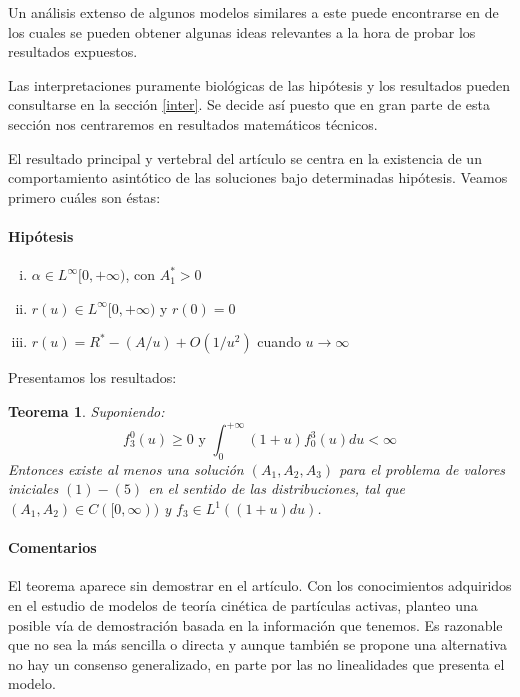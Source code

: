 \documentclass[1p]{elsarticle}
\newtheorem{thm}{Teorema}
\begin{document}
 Un análisis extenso de algunos modelos similares a este puede encontrarse en \cite{elvesier,existencia,libro,original,pdf,textolargo} de los cuales se pueden obtener algunas ideas relevantes a la hora de probar los resultados expuestos.

Las interpretaciones puramente biológicas de las hipótesis y los resultados pueden consultarse en la sección \ref*{inter}. Se decide así puesto que en gran parte de esta sección nos centraremos en resultados matemáticos técnicos.

El resultado principal y vertebral del artículo se centra en la existencia de un comportamiento asintótico de las soluciones bajo determinadas hipótesis.
Veamos primero cuáles son éstas:
\paragraph{Hipótesis}
\label{hipo}\begin{enumerate}[(i)]
	\item $\alpha \in L^\infty[0,+\infty)$, con $A_1^*>0$
	\item $r(u)\in L^\infty[0,+\infty)$ y $r(0)=0$
	\item $r(u)=R^*-(A/u)+O(1/u^2)$ cuando $u\rightarrow\infty$
\end{enumerate}
Presentamos los resultados:

 \begin{thm}
Suponiendo: \begin{equation}f_3^0(u)\geq0 \text{ y } \int_{0}^{+\infty}(1+u)f_0^3(u)du<\infty\label{cond}\end{equation}
Entonces existe al menos una solución $(A_1,A_2,A_3)$ para el problema de valores iniciales $(1)-(5)$ en el sentido de las distribuciones, tal que $(A_1,A_2)\in C([0,\infty))$ y $f_3\in L^1((1+u)du)$.
 \end{thm}
\paragraph{Comentarios}El teorema aparece sin demostrar en el artículo. Con los conocimientos adquiridos en el estudio de modelos de teoría cinética de partículas activas, planteo una posible vía de demostración basada en la información que tenemos. Es razonable que no sea la más sencilla o directa y aunque también se propone una alternativa no hay un consenso generalizado, en parte por las no linealidades que presenta el modelo.
\end{document}

